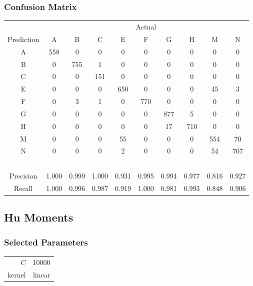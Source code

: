 \documentclass[12pt]{article}
\begin{document}
\subsubsection*{Confusion Matrix}
\hspace{1cm}
    \begin{tabular}{c|ccccccccc}
	& \multicolumn{9}{c}{Actual} \\ 
     Prediction         & A     & B     & C     & E     & F     & G     & H     & M     & N     \\ \hline
    A         & 558   & 0     & 0     & 0     & 0     & 0     & 0     & 0     & 0     \\
    B         & 0     & 755   & 1     & 0     & 0     & 0     & 0     & 0     & 0     \\
    C         & 0     & 0     & 151   & 0     & 0     & 0     & 0     & 0     & 0     \\
    E         & 0     & 0     & 0     & 650   & 0     & 0     & 0     & 45    & 3     \\
    F         & 0     & 3     & 1     & 0     & 770   & 0     & 0     & 0     & 0     \\
    G         & 0     & 0     & 0     & 0     & 0     & 877   & 5     & 0     & 0     \\
    H         & 0     & 0     & 0     & 0     & 0     & 17    & 710   & 0     & 0     \\
    M         & 0     & 0     & 0     & 55    & 0     & 0     & 0     & 554   & 70    \\
    N         & 0     & 0     & 0     & 2     & 0     & 0     & 0     & 54    & 707   \\
    ~         & ~     & ~     & ~     & ~     & ~     & ~     & ~     & ~     & ~     \\
    Precision & 1.000 & 0.999 & 1.000 & 0.931 & 0.995 & 0.994 & 0.977 & 0.816 & 0.927 \\
    Recall    & 1.000 & 0.996 & 0.987 & 0.919 & 1.000 & 0.981 & 0.993 & 0.848 & 0.906 \\
    \end{tabular}

\newpage
\subsection*{Hu Moments}


\subsubsection*{Selected Parameters}
	\hspace{1cm}
	\begin{tabular}{r|c}
	\(C\) & 10000 \\
	kernel & linear \\
	\end{tabular}
\end{document}
